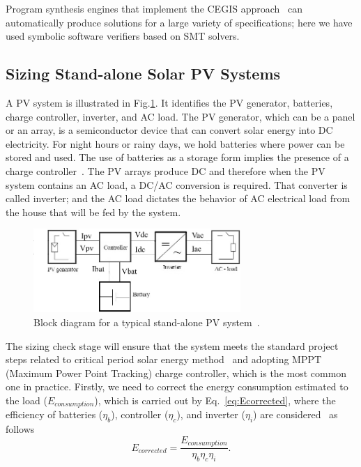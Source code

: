 \documentclass[review]{elsarticle}
\begin{document}
Program synthesis engines that implement the CEGIS approach~\cite{sketch} can automatically produce solutions for a large variety of specifications; here we have used symbolic software verifiers based on SMT solvers.

\subsection{Sizing Stand-alone Solar PV Systems}
\label{sec:sizing}

A PV system is illustrated in Fig.\ref{fig:blockdiagram}. It identifies the PV generator, batteries, charge controller, inverter, and AC load. 
The PV generator, which can be a panel or an array, is a semiconductor device that can convert solar energy into DC electricity.  
For night hours or rainy days, we hold batteries where power can be stored and used. The use of batteries as a storage 
form implies the presence of a charge controller~\cite{Hansen}. The PV arrays produce DC and therefore when the PV system 
contains an AC load, a DC/AC conversion is required. That converter is called inverter; and the AC load dictates the behavior 
of AC electrical load from the house that will be fed by the system.
%
\begin{figure}[h]
\includegraphics[width=0.7\textwidth]{blockdiagramPVS2_rev}
\centering
\caption{Block diagram for a typical stand-alone PV system~\cite{Hansen}.}
\label{fig:blockdiagram} 
\end{figure}

The sizing check stage will ensure that the system meets the standard project steps related 
to critical period solar energy method~\cite{Pinho} and adopting MPPT (Maximum Power Point Tracking) charge controller,
which is the most common one in practice. Firstly, we need to correct the energy consumption estimated to the load 
($E_{consumption}$), which is carried out by Eq.~\eqref{eq:Ecorrected}, where the efficiency of batteries ($\eta_{b}$), 
controller ($\eta_{c}$), and inverter ($\eta_{i}$) are considered~\cite{Pinho} as follows
%
\begin{equation}
\label{eq:Ecorrected}
E_{corrected} = \dfrac{E_{consumption}}{\eta_{b} \eta_{c} \eta_{i} }.
\end{equation}
\end{document}
